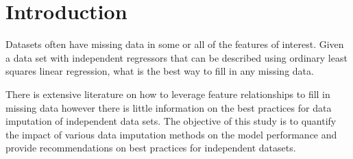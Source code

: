 \documentclass[../paper.tex]{subfiles}
\begin{document}
\section{Introduction}

Datasets often have missing data in some or all of the features of interest.
Given a data set with independent regressors that can be described using ordinary
least squares linear regression, what is the best way to fill in any missing data.


There is extensive literature on how to leverage feature relationships
to fill in missing data however there is little information on the best practices
for data imputation of independent data sets.
The objective of this study is to quantify the impact of various data
imputation methods on the model performance and provide recommendations on best
practices for independent datasets.



\end{document}
